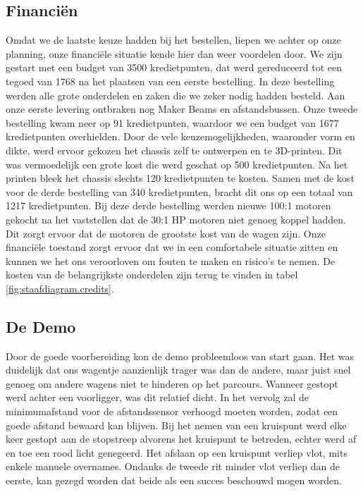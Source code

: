 \documentclass[a4paper,kulak]{kulakarticle}
\begin{document}
\subsection{Financiën}

Omdat we de laatste keuze hadden bij het bestellen, liepen we achter op onze planning, onze financiële situatie kende hier dan weer voordelen door. We zijn gestart met een budget van 3500 kredietpunten, dat werd gereduceerd tot een tegoed van 1768 na het plaatsen van een eerste bestelling. In deze bestelling werden alle grote onderdelen en zaken die we zeker nodig hadden besteld.  Aan onze eerste levering ontbraken nog Maker Beams en afstandsbussen. Onze tweede bestelling kwam neer op 91 kredietpunten, waardoor we een budget van 1677 kredietpunten overhielden. Door de vele keuzemogelijkheden, waaronder vorm en dikte, werd ervoor gekozen het chassis zelf te ontwerpen en te 3D-printen. Dit was vermoedelijk een grote kost die werd geschat op 500 kredietpunten. Na het printen bleek het chassis slechts 120 kredietpunten te kosten. Samen met de kost voor de derde bestelling van 340 kredietpunten, bracht dit ons op een totaal van 1217 kredietpunten. Bij deze derde bestelling werden nieuwe 100:1 motoren gekocht na het vaststellen dat de 30:1 HP motoren niet genoeg koppel hadden. Dit zorgt ervoor dat de motoren de grootste kost van de wagen zijn. Onze financiële toestand zorgt ervoor dat we in een comfortabele situatie zitten en kunnen we het ons veroorloven om fouten te maken en risico's te nemen. De kosten van de belangrijkste onderdelen zijn terug te vinden in tabel \ref{fig:staafdiagram.credits}.


\subsection{De Demo}
Door de goede voorbereiding kon de demo probleemloos van start gaan. Het was duidelijk dat ons wagentje aanzienlijk trager was dan de andere, maar juist snel genoeg om andere wagens niet te hinderen op het parcours. Wanneer gestopt werd achter een voorligger, was dit relatief dicht. In het vervolg zal de minimumafstand voor de afstandssensor verhoogd moeten worden, zodat een goede afstand bewaard kan blijven. Bij het nemen van een kruispunt werd elke keer gestopt aan de stopstreep alvorens het kruispunt te betreden, echter werd af en toe een rood licht genegeerd. Het afslaan op een kruispunt verliep vlot, mits enkele manuele overnames. Ondanks de tweede rit minder vlot verliep dan de eerste, kan gezegd worden dat beide als een succes beschouwd mogen worden.  
\end{document}
